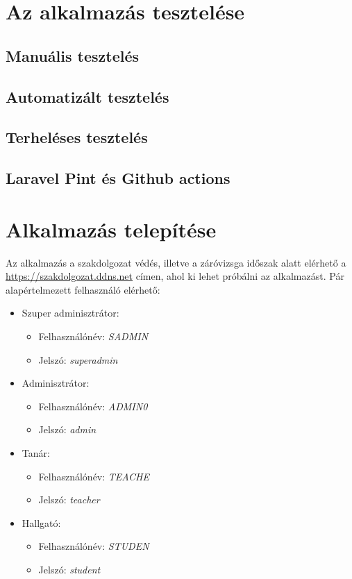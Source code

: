 \documentclass[
]{thesis-ekf}
\theoremstyle{definition}
\theoremstyle{remark}
\begin{document}


\chapter{Az alkalmazás tesztelése}
\label{testing}
\section{Manuális tesztelés}
\section{Automatizált tesztelés}
\section{Terheléses tesztelés}
\section{Laravel Pint és Github actions}

\chapter{Alkalmazás telepítése}
\label{setup}
Az alkalmazás a szakdolgozat védés, illetve a záróvizsga időszak alatt elérhető a \url{https://szakdolgozat.ddns.net} címen, ahol ki lehet próbálni az alkalmazást. Pár alapértelmezett felhasználó elérhető:
\begin{itemize}
	\item Szuper adminisztrátor:
	\begin{itemize}
		\item Felhasználónév: \emph{SADMIN}
		\item Jelszó: \emph{superadmin}
	\end{itemize}
	\item Adminisztrátor:
	\begin{itemize}
		\item Felhasználónév: \emph{ADMIN0}
		\item Jelszó: \emph{admin}
	\end{itemize}
	\item Tanár:
	\begin{itemize}
		\item Felhasználónév: \emph{TEACHE}
		\item Jelszó: \emph{teacher}
	\end{itemize}
	\item Hallgató:
	\begin{itemize}
		\item Felhasználónév: \emph{STUDEN}
		\item Jelszó: \emph{student}
	\end{itemize}
\end{itemize}
\end{document}
